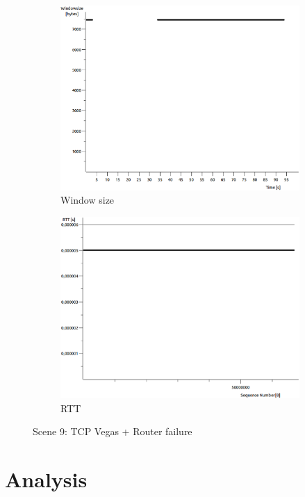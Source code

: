 \documentclass[conference,a4paper]{../../sty/IEEEtran}
\begin{document}
\begin{figure}
\begin{subfigure}[b]{0.2\textwidth}
  \includegraphics[width=\textwidth]{s9-0_wsize}
  \caption{Window size}
 \end{subfigure}
 \begin{subfigure}[b]{0.2\textwidth}
  \includegraphics[width=\textwidth]{s9-0_rtt}
  \caption{RTT}
 \end{subfigure}
 \caption{Scene 9: TCP Vegas + Router failure}
\end{figure}


\section{Analysis}
\end{document}
